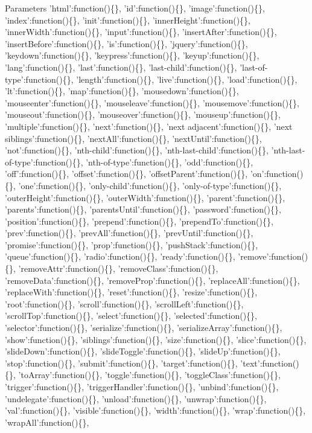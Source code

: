 \begin{DoxyParams}{Parameters}
'html'\-:function()\{\}, 'id'\-:function()\{\}, 'image'\-:function()\{\}, 'index'\-:function()\{\}, 'init'\-:function()\{\}, 'inner\-Height'\-:function()\{\}, 'inner\-Width'\-:function()\{\}, 'input'\-:function()\{\}, 'insert\-After'\-:function()\{\}, 'insert\-Before'\-:function()\{\}, 'is'\-:function()\{\}, 'jquery'\-:function()\{\}, 'keydown'\-:function()\{\}, 'keypress'\-:function()\{\}, 'keyup'\-:function()\{\}, 'lang'\-:function()\{\}, 'last'\-:function()\{\}, 'last-\/child'\-:function()\{\}, 'last-\/of-\/type'\-:function()\{\}, 'length'\-:function()\{\}, 'live'\-:function()\{\}, 'load'\-:function()\{\}, 'lt'\-:function()\{\}, 'map'\-:function()\{\}, 'mousedown'\-:function()\{\}, 'mouseenter'\-:function()\{\}, 'mouseleave'\-:function()\{\}, 'mousemove'\-:function()\{\}, 'mouseout'\-:function()\{\}, 'mouseover'\-:function()\{\}, 'mouseup'\-:function()\{\}, 'multiple'\-:function()\{\}, 'next'\-:function()\{\}, 'next adjacent'\-:function()\{\}, 'next siblings'\-:function()\{\}, 'next\-All'\-:function()\{\}, 'next\-Until'\-:function()\{\}, 'not'\-:function()\{\}, 'nth-\/child'\-:function()\{\}, 'nth-\/last-\/child'\-:function()\{\}, 'nth-\/last-\/of-\/type'\-:function()\{\}, 'nth-\/of-\/type'\-:function()\{\}, 'odd'\-:function()\{\}, 'off'\-:function()\{\}, 'offset'\-:function()\{\}, 'offset\-Parent'\-:function()\{\}, 'on'\-:function()\{\}, 'one'\-:function()\{\}, 'only-\/child'\-:function()\{\}, 'only-\/of-\/type'\-:function()\{\}, 'outer\-Height'\-:function()\{\}, 'outer\-Width'\-:function()\{\}, 'parent'\-:function()\{\}, 'parents'\-:function()\{\}, 'parents\-Until'\-:function()\{\}, 'password'\-:function()\{\}, 'position'\-:function()\{\}, 'prepend'\-:function()\{\}, 'prepend\-To'\-:function()\{\}, 'prev'\-:function()\{\}, 'prev\-All'\-:function()\{\}, 'prev\-Until'\-:function()\{\}, 'promise'\-:function()\{\}, 'prop'\-:function()\{\}, 'push\-Stack'\-:function()\{\}, 'queue'\-:function()\{\}, 'radio'\-:function()\{\}, 'ready'\-:function()\{\}, 'remove'\-:function()\{\}, 'remove\-Attr'\-:function()\{\}, 'remove\-Class'\-:function()\{\}, 'remove\-Data'\-:function()\{\}, 'remove\-Prop'\-:function()\{\}, 'replace\-All'\-:function()\{\}, 'replace\-With'\-:function()\{\}, 'reset'\-:function()\{\}, 'resize'\-:function()\{\}, 'root'\-:function()\{\}, 'scroll'\-:function()\{\}, 'scroll\-Left'\-:function()\{\}, 'scroll\-Top'\-:function()\{\}, 'select'\-:function()\{\}, 'selected'\-:function()\{\}, 'selector'\-:function()\{\}, 'serialize'\-:function()\{\}, 'serialize\-Array'\-:function()\{\}, 'show'\-:function()\{\}, 'siblings'\-:function()\{\}, 'size'\-:function()\{\}, 'slice'\-:function()\{\}, 'slide\-Down'\-:function()\{\}, 'slide\-Toggle'\-:function()\{\}, 'slide\-Up'\-:function()\{\}, 'stop'\-:function()\{\}, 'submit'\-:function()\{\}, 'target'\-:function()\{\}, 'text'\-:function()\{\}, 'to\-Array'\-:function()\{\}, 'toggle'\-:function()\{\}, 'toggle\-Class'\-:function()\{\}, 'trigger'\-:function()\{\}, 'trigger\-Handler'\-:function()\{\}, 'unbind'\-:function()\{\}, 'undelegate'\-:function()\{\}, 'unload'\-:function()\{\}, 'unwrap'\-:function()\{\}, 'val'\-:function()\{\}, 'visible'\-:function()\{\}, 'width'\-:function()\{\}, 'wrap'\-:function()\{\}, 'wrap\-All'\-:function()\{\}, 
\end{DoxyParams}
